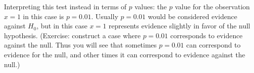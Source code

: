 \documentclass[times,11pt]{article}
\def\ffA{f_F}
\def\fsA{f_S}
\def\nsA{{n_s}}
\def\nfA{{n_f}}
\def\pif{\pi_F}
\def\pis{\pi_S}
\def\data{x}
\begin{document}
Interpreting this test instead in terms of $p$ values: the $p$ value for the observation $\data=1$ in this case is $p=0.01$. Usually $p=0.01$ would be considered
evidence against $H_0$, but in this case $\data=1$ represents evidence slightly in favor of the null hypothesis.
(Exercise: construct a case where $p=0.01$ corresponds to evidence against the null. Thus you will see that sometimes $p=0.01$ can correspond
to evidence for the null, and other times it can correspond to evidence against the null.)






\end{document}
